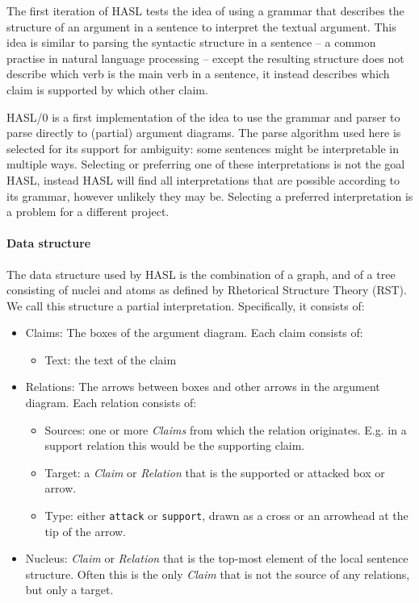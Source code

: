 The first iteration of HASL tests the idea of using a grammar that describes the structure of an argument in a sentence to interpret the textual argument. This idea is similar to parsing the syntactic structure in a sentence -- a common practise in natural language processing -- except the resulting structure does not describe which verb is the main verb in a sentence, it instead describes which claim is supported by which other claim.

HASL/0 is a first implementation of the idea to use the grammar and parser to parse directly to (partial) argument diagrams. The parse algorithm used here is selected for its support for ambiguity: some sentences might be interpretable in multiple ways. Selecting or preferring one of these interpretations is not the goal HASL, instead HASL will find all interpretations that are possible according to its grammar, however unlikely they may be. Selecting a preferred interpretation is a problem for a different project.

\paragraph{Data structure}

The data structure used by HASL is the combination of a graph, and of a tree consisting of nuclei and atoms as defined by Rhetorical Structure Theory (RST). We call this structure a partial interpretation. Specifically, it consists of:

\begin{itemize}
	\item Claims: The boxes of the argument diagram. Each claim consists of:
	\begin{itemize}
		\item Text: the text of the claim
	\end{itemize}
	\item Relations: The arrows between boxes and other arrows in the argument diagram. Each relation consists of:
	\begin{itemize}
		\item Sources: one or more \emph{Claims} from which the relation originates. E.g. in a support relation this would be the supporting claim.
		\item Target: a \emph{Claim} or \emph{Relation} that is the supported or attacked box or arrow.
		\item Type: either \texttt{attack} or \texttt{support}, drawn as a cross or an arrowhead at the tip of the arrow.
	\end{itemize}
	\item Nucleus: \emph{Claim} or \emph{Relation} that is the top-most element of the local sentence structure. Often this is the only \emph{Claim} that is not the source of any relations, but only a target.
\end{itemize}

